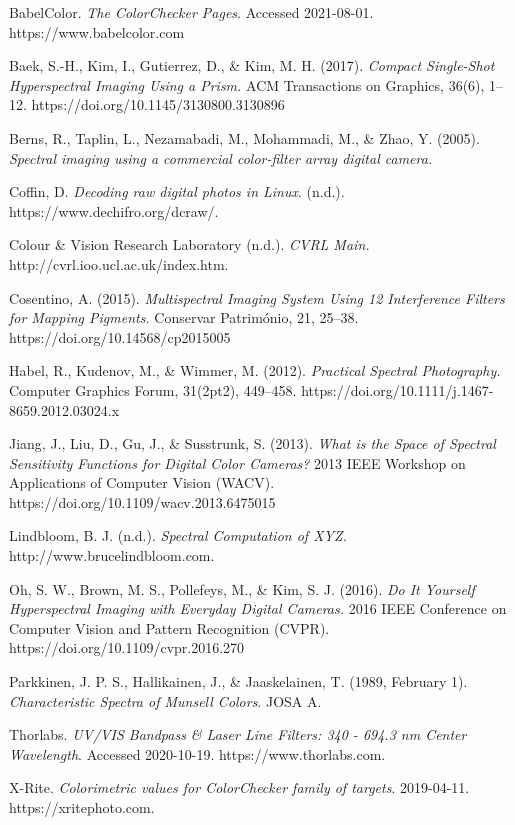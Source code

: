 \documentclass[twocolumn,10pt]{asme2ej}
\begin{document}
 \begin{thebibliography}{12}

{BabelColor. \emph{The ColorChecker Pages}. Accessed 2021-08-01. https://www.babelcolor.com}

{Baek, S.-H., Kim, I., Gutierrez, D., \& Kim, M. H. (2017). \emph{Compact Single-Shot Hyperspectral Imaging Using a Prism.} ACM Transactions on Graphics, 36(6), 1–12. https://doi.org/10.1145/3130800.3130896}

{Berns, R., Taplin, L., Nezamabadi, M., Mohammadi, M., \& Zhao, Y. (2005). \emph{Spectral imaging using a commercial color-filter array digital camera.}}

{Coffin, D. \emph{Decoding raw digital photos in Linux}. (n.d.). https://www.dechifro.org/dcraw/.}

{Colour \& Vision Research Laboratory (n.d.). \emph{CVRL Main.} http://cvrl.ioo.ucl.ac.uk/index.htm.}

{Cosentino, A. (2015). \emph{Multispectral Imaging System Using 12 Interference Filters for Mapping Pigments.} Conservar Património, 21, 25–38. https://doi.org/10.14568/cp2015005}

{Habel, R., Kudenov, M., \& Wimmer, M. (2012). \emph{Practical Spectral Photography.} Computer Graphics Forum, 31(2pt2), 449–458. https://doi.org/10.1111/j.1467-8659.2012.03024.x}

{Jiang, J., Liu, D., Gu, J., \& Susstrunk, S. (2013). \emph{What is the Space of Spectral Sensitivity Functions for Digital Color Cameras?} 2013 IEEE Workshop on Applications of Computer Vision (WACV). https://doi.org/10.1109/wacv.2013.6475015}

{Lindbloom, B. J. (n.d.). \emph{Spectral Computation of XYZ.} http://www.brucelindbloom.com.}

{Oh, S. W., Brown, M. S., Pollefeys, M., \& Kim, S. J. (2016). \emph{Do It Yourself Hyperspectral Imaging with Everyday Digital Cameras.} 2016 IEEE Conference on Computer Vision and Pattern Recognition (CVPR). https://doi.org/10.1109/cvpr.2016.270}

 {Parkkinen, J. P. S., Hallikainen, J., \& Jaaskelainen, T. (1989, February 1). \emph{Characteristic Spectra of Munsell Colors}. JOSA A.}

{Thorlabs. \emph{UV/VIS Bandpass \& Laser Line Filters: 340 - 694.3 nm Center Wavelength}. Accessed 2020-10-19. https://www.thorlabs.com.}

{X-Rite. \emph{Colorimetric values for ColorChecker family of targets}. 2019-04-11. https://xritephoto.com.}

\end{thebibliography}
 
\end{document}

